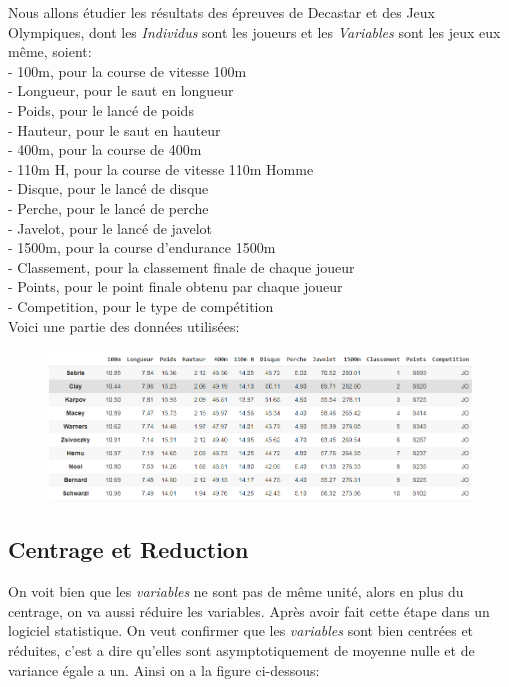 \documentclass{article}
\begin{document}
Nous allons étudier les résultats des épreuves de Decastar et des Jeux Olympiques, dont les \textit{Individus} sont les joueurs et les \textit{Variables} sont les jeux eux même, soient:
\newline
\\
- 100m, pour la course de vitesse 100m \\
- Longueur, pour le saut en longueur \\
- Poids, pour le lancé de poids \\
- Hauteur, pour le saut en hauteur \\
- 400m, pour la course de 400m \\
- 110m H, pour la course de vitesse 110m Homme \\
- Disque, pour le lancé de disque \\
- Perche, pour le lancé de perche \\
- Javelot, pour le lancé de javelot \\
- 1500m, pour la course d'endurance 1500m \\
- Classement, pour la classement finale de chaque joueur \\
- Points, pour le point finale obtenu par chaque joueur \\
- Competition, pour le type de compétition \\

Voici une partie des données utilisées:

\begin{figure}[h!]
\includegraphics[width=\linewidth]{images/data_initials.png}
\end{figure}

\subsection{Centrage et Reduction}

On voit bien que les \textit{variables} ne sont pas de même unité, alors en plus du centrage, on va aussi réduire les variables. Après avoir fait cette étape dans un logiciel statistique. On veut confirmer que les \textit{variables} sont bien centrées et réduites, c'est a dire qu'elles sont asymptotiquement de moyenne nulle et de variance égale a un. Ainsi on a la figure ci-dessous:
\end{document}
